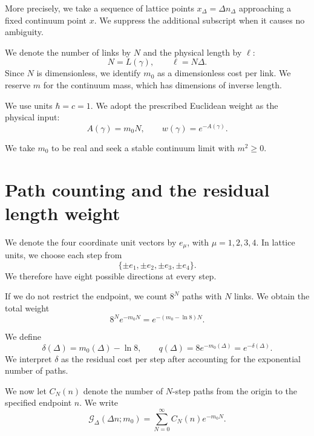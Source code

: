 \documentclass[11pt,a4paper]{article}
\numberwithin{equation}{section}
\begin{document}
More precisely, we take a sequence of lattice points
$x_\Delta=\Delta n_\Delta$ approaching a fixed continuum
point $x$. We suppress the additional subscript when
it causes no ambiguity.

We denote the number of links by $N$ and the physical
length by $\ell$:
\begin{equation}
    N=L(\gamma),
    \qquad
    \ell=N\Delta.
\end{equation}
Since $N$ is dimensionless, we identify $m_0$ as a
dimensionless cost per link. We reserve $m$ for the
continuum mass, which has dimensions of inverse length.

We use units $\hbar=c=1$. We adopt the prescribed
Euclidean weight as the physical input:
\begin{equation}
    A(\gamma)=m_0N,
    \qquad
    w(\gamma)=e^{-A(\gamma)}.
\end{equation}

We take $m_0$ to be real and seek a stable continuum
limit with $m^2\geq0$.

\section{Path counting and the residual length weight}

We denote the four coordinate unit vectors by
$e_\mu$, with $\mu=1,2,3,4$. In lattice units, we
choose each step from
\begin{equation}
    \{\pm e_1,\pm e_2,\pm e_3,\pm e_4\}.
\end{equation}
We therefore have eight possible directions at every
step.

If we do not restrict the endpoint, we count $8^N$
paths with $N$ links. We obtain the total weight
\begin{equation}
    8^Ne^{-m_0N}
    =
    e^{-(m_0-\ln8)N}.
\end{equation}

We define
\begin{equation}
    \delta(\Delta)=m_0(\Delta)-\ln8,
    \qquad
    q(\Delta)=8e^{-m_0(\Delta)}=e^{-\delta(\Delta)}.
    \label{eq:delta}
\end{equation}
We interpret $\delta$ as the residual cost per step
after accounting for the exponential number of paths.

We now let $C_N(n)$ denote the number of $N$-step
paths from the origin to the specified endpoint $n$.
We write
\begin{equation}
    \mathcal G_\Delta(\Delta n;m_0)
    =
    \sum_{N=0}^{\infty}C_N(n)e^{-m_0N}.
\end{equation}
\end{document}
